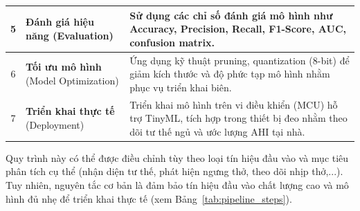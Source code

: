 \begin{table}[htbp]
\begin{tabular}{|c|p{3.8cm}|p{9.2cm}|}
    \hline
    5            & \textbf{Đánh giá hiệu năng} \newline (Evaluation)                              & Sử dụng các chỉ số đánh giá mô hình như Accuracy, Precision, Recall, F1-Score, AUC, confusion matrix.                                            \\
    \hline
    6            & \textbf{Tối ưu mô hình} \newline (Model Optimization)                          & Ứng dụng kỹ thuật pruning, quantization (8-bit) để giảm kích thước và độ phức tạp mô hình nhằm phục vụ triển khai biên.                          \\
    \hline
    7            & \textbf{Triển khai thực tế} \newline (Deployment)                              & Triển khai mô hình trên vi điều khiển (MCU) hỗ trợ TinyML, tích hợp trong thiết bị đeo nhằm theo dõi tư thế ngủ và ước lượng AHI tại nhà.        \\
    \hline
  \end{tabular}
\end{table}

Quy trình này có thể được điều chỉnh tùy theo loại tín hiệu đầu vào và mục tiêu
phân tích cụ thể (nhận diện tư thế, phát hiện ngưng thở, theo dõi nhịp
thở,...). Tuy nhiên, nguyên tắc cơ bản là đảm bảo tín hiệu đầu vào chất lượng
cao và mô hình đủ nhẹ để triển khai thực tế (xem
Bảng~\ref{tab:pipeline_steps}).

